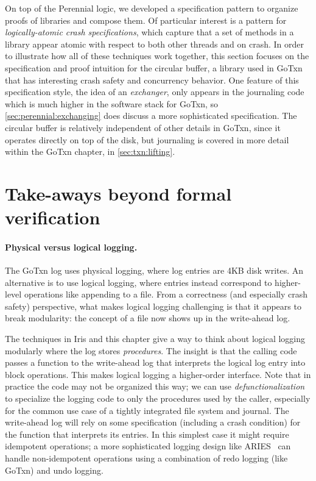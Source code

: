 On top of the Perennial logic, we developed a specification pattern to organize
proofs of libraries and compose them. Of particular interest is a pattern for
\emph{logically-atomic crash specifications}, which capture that a set of
methods in a library appear atomic with respect to both other threads and on
crash. In order to illustrate how all of these techniques work together, this
section focuses on the specification and proof intuition for the circular
buffer, a library used in GoTxn that has interesting crash safety and
concurrency behavior. One feature of this specification style, the idea of an
\emph{exchanger}, only appears in the journaling code which is much higher in
the software stack for GoTxn, so \cref{sec:perennial:exchanging} does discuss a
more sophisticated specification. The circular buffer is relatively independent
of other details in GoTxn, since it operates directly on top of the disk, but
journaling is covered in more detail within the GoTxn chapter, in
\cref{sec:txn:lifting}.





\section{Take-aways beyond formal verification}

\paragraph{Physical versus logical logging.} The GoTxn log uses physical
logging, where log entries are 4KB disk writes. An alternative is to use logical
logging, where entries instead correspond to higher-level operations like
appending to a file. From a correctness (and especially crash safety)
perspective, what makes logical logging challenging is that it appears to break
modularity: the concept of a file now shows up in the write-ahead log.

The techniques in Iris and this chapter give a way to think about logical
logging modularly where the log stores \emph{procedures}. The insight is that
the calling code passes a function to the write-ahead log that interprets the
logical log entry into block operations. This makes logical logging a
higher-order interface. Note that in practice the code may not be organized this
way; we can use \emph{defunctionalization} to specialize the logging code to
only the procedures used by the caller, especially for the common use case of a
tightly integrated file system and journal. The write-ahead log will rely on
some specification (including a crash condition) for the function that
interprets its entries. In this simplest case it might require idempotent
operations; a more sophisticated logging design like ARIES~\cite{mohan:aries}
can handle non-idempotent operations using a combination of redo logging (like
GoTxn) and undo logging.
